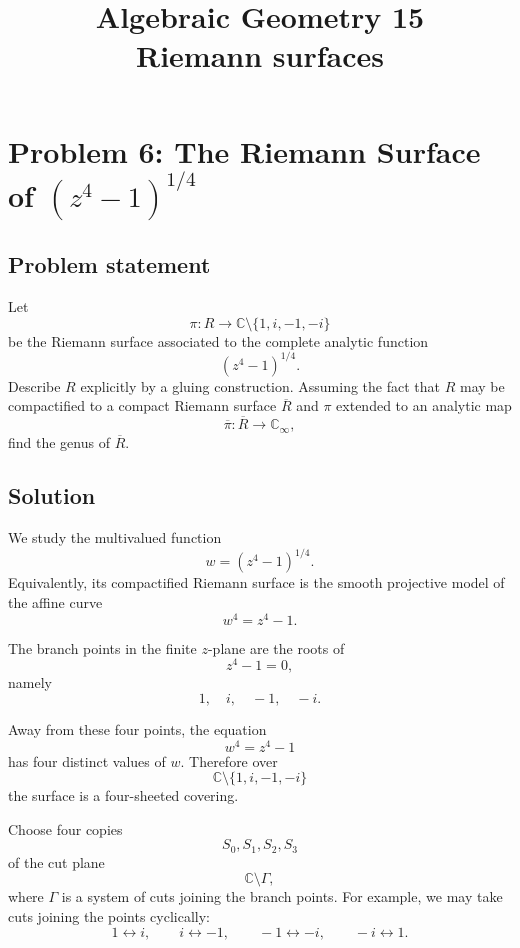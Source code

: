 \documentclass[12pt,a4paper]{article}
\theoremstyle{notespace}
\begin{document}
\title{Algebraic Geometry 15\\
	\large Riemann surfaces}
\author{}
\date{}

	\maketitle
	

	\setcounter{section}{0}

\tableofcontents

	\clearpage
	
\section{Problem 6: The Riemann Surface of \texorpdfstring{$(z^4-1)^{1/4}$}{(z4-1)1/4}}

\subsection*{Problem statement}

Let
\[
\pi:R\to \mathbb C\setminus\{1,i,-1,-i\}
\]
be the Riemann surface associated to the complete analytic function
\[
(z^4-1)^{1/4}.
\]
Describe \(R\) explicitly by a gluing construction. Assuming the fact that
\(R\) may be compactified to a compact Riemann surface \(\overline R\) and
\(\pi\) extended to an analytic map
\[
\overline \pi:\overline R\to \mathbb C_\infty,
\]
find the genus of \(\overline R\).

\subsection*{Solution}

We study the multivalued function
\[
w=(z^4-1)^{1/4}.
\]
Equivalently, its compactified Riemann surface is the smooth projective model
of the affine curve
\[
w^4=z^4-1.
\]

The branch points in the finite \(z\)-plane are the roots of
\[
z^4-1=0,
\]
namely
\[
1,\quad i,\quad -1,\quad -i.
\]

Away from these four points, the equation
\[
w^4=z^4-1
\]
has four distinct values of \(w\). Therefore over
\[
\mathbb C\setminus\{1,i,-1,-i\}
\]
the surface is a four-sheeted covering.

Choose four copies
\[
S_0,S_1,S_2,S_3
\]
of the cut plane
\[
\mathbb C\setminus\Gamma,
\]
where \(\Gamma\) is a system of cuts joining the branch points. For example,
we may take cuts joining the points cyclically:
\[
1\longleftrightarrow i,\qquad
i\longleftrightarrow -1,\qquad
-1\longleftrightarrow -i,\qquad
-i\longleftrightarrow 1.
\]
\end{document}
